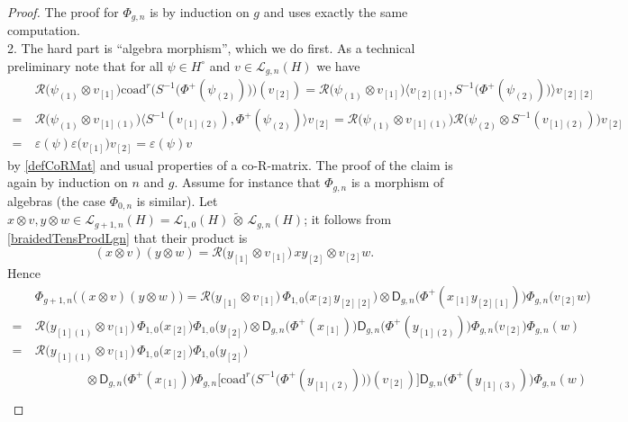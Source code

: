 \documentclass[11pt]{amsart}
\begin{document}
\begin{proof}
The proof for $\Phi_{g,n}$ is by induction on $g$ and uses exactly the same computation.
\\2. The hard part is ``algebra morphism'', which we do first. As a technical preliminary note that for all $\psi \in H^\circ$ and $v \in \mathcal{L}_{g,n}(H)$ we have
\begin{align*}
&\mathcal{R}\bigl( \psi_{(1)} \otimes v_{[1]} \bigr)  \mathrm{coad}^r\bigl( S^{-1}\bigl(\Phi^+(\psi_{(2)})\bigr) \bigr)(v_{[2]}) = \mathcal{R}\bigl( \psi_{(1)} \otimes v_{[1]} \bigr) \bigl\langle v_{[2][1]}, S^{-1}\bigl(\Phi^+(\psi_{(2)})\bigr) \bigr\rangle v_{[2][2]}\\
=\:&\mathcal{R}\bigl( \psi_{(1)} \otimes v_{[1](1)} \bigr) \bigl\langle S^{-1}(v_{[1](2)}), \Phi^+(\psi_{(2)}) \bigr\rangle v_{[2]} = \mathcal{R}\bigl( \psi_{(1)} \otimes v_{[1](1)} \bigr) \mathcal{R}\bigl( \psi_{(2)} \otimes S^{-1}(v_{[1](2)}) \bigr) v_{[2]}\\
=\:&\varepsilon(\psi) \varepsilon\bigl( v_{[1]} \bigr) v_{[2]} = \varepsilon(\psi)v
\end{align*}
by \eqref{defCoRMat} and usual properties of a co-R-matrix. The proof of the claim is again by induction on $n$ and $g$. Assume for instance that $\Phi_{g,n}$ is a morphism of algebras (the case $\Phi_{0,n}$ is similar). Let $x \otimes v, y \otimes w \in \mathcal{L}_{g+1,n}(H) = \mathcal{L}_{1,0}(H) \,\widetilde{\otimes}\, \mathcal{L}_{g,n}(H)$; it follows from \eqref{braidedTensProdLgn} that their product is
\[ (x \otimes v)(y \otimes w) = \mathcal{R}\bigl( y_{[1]} \otimes v_{[1]} \bigr) \, xy_{[2]} \otimes v_{[2]}w. \]
Hence
\begin{align*}
&\Phi_{g+1,n}\bigl( (x \otimes v)(y \otimes w) \bigr) = \mathcal{R}\bigl( y_{[1]} \otimes v_{[1]} \bigr) \, \Phi_{1,0}\bigl(x_{[2]}y_{[2][2]}\bigr) \otimes \mathsf{D}_{g,n}\bigl( \Phi^+(x_{[1]}y_{[2][1]}) \bigr) \Phi_{g,n}\bigl(v_{[2]}w\bigr)\\
=\:& \mathcal{R}\bigl( y_{[1](1)} \otimes v_{[1]} \bigr) \, \Phi_{1,0}\bigl(x_{[2]}\bigr)\Phi_{1,0}\bigl(y_{[2]}\bigr) \otimes \mathsf{D}_{g,n}\bigl( \Phi^+(x_{[1]}) \bigr)  \mathsf{D}_{g,n}\bigl( \Phi^+(y_{[1](2)}) \bigr) \Phi_{g,n}\bigl(v_{[2]}\bigr)\Phi_{g,n}(w)\\
=\:& \mathcal{R}\bigl( y_{[1](1)} \otimes v_{[1]} \bigr) \, \Phi_{1,0}\bigl(x_{[2]}\bigr)\Phi_{1,0}\bigl(y_{[2]}\bigr)\\
&\qquad\qquad\otimes \mathsf{D}_{g,n}\bigl( \Phi^+(x_{[1]}) \bigr) \Phi_{g,n}\bigl[ \mathrm{coad}^r\bigl( S^{-1}\bigl(\Phi^+(y_{[1](2)})\bigr) \bigr)(v_{[2]})\bigr] \mathsf{D}_{g,n}\bigl( \Phi^+(y_{[1](3)})\bigr) \Phi_{g,n}(w)\\

\end{align*}
\end{proof}
\end{document}
